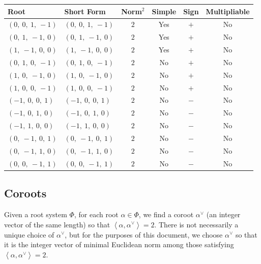 \documentclass[11pt]{article}
\newcommand{\noi}{\noindent}
\newcommand{\la}{\left\langle}
\newcommand{\ra}{\right\rangle}
\theoremstyle{definition}
\begin{document}
\noi \begin{tabular}{|l|l|c|c|c|c|}
    \hline
    \textbf{Root} & \textbf{Short Form} & \textbf{Norm$^2$} & \textbf{Simple} & \textbf{Sign} & \textbf{Multipliable} \\
    \hline
    $\left( 0, \  0, \  1, \  -1\right)$ & $\left( 0, \  0, \  1, \  -1\right)$ & $2$ & Yes & $+$ & No \\
    \hline
    $\left( 0, \  1, \  -1, \  0\right)$ & $\left( 0, \  1, \  -1, \  0\right)$ & $2$ & Yes & $+$ & No \\
    \hline
    $\left( 1, \  -1, \  0, \  0\right)$ & $\left( 1, \  -1, \  0, \  0\right)$ & $2$ & Yes & $+$ & No \\
    \hline
    $\left( 0, \  1, \  0, \  -1\right)$ & $\left( 0, \  1, \  0, \  -1\right)$ & $2$ & No & $+$ & No \\
    \hline
    $\left( 1, \  0, \  -1, \  0\right)$ & $\left( 1, \  0, \  -1, \  0\right)$ & $2$ & No & $+$ & No \\
    \hline
    $\left( 1, \  0, \  0, \  -1\right)$ & $\left( 1, \  0, \  0, \  -1\right)$ & $2$ & No & $+$ & No \\
    \hline
    $\left( -1, \  0, \  0, \  1\right)$ & $\left( -1, \  0, \  0, \  1\right)$ & $2$ & No & $-$ & No \\
    \hline
    $\left( -1, \  0, \  1, \  0\right)$ & $\left( -1, \  0, \  1, \  0\right)$ & $2$ & No & $-$ & No \\
    \hline
    $\left( -1, \  1, \  0, \  0\right)$ & $\left( -1, \  1, \  0, \  0\right)$ & $2$ & No & $-$ & No \\
    \hline
    $\left( 0, \  -1, \  0, \  1\right)$ & $\left( 0, \  -1, \  0, \  1\right)$ & $2$ & No & $-$ & No \\
    \hline
    $\left( 0, \  -1, \  1, \  0\right)$ & $\left( 0, \  -1, \  1, \  0\right)$ & $2$ & No & $-$ & No \\
    \hline
    $\left( 0, \  0, \  -1, \  1\right)$ & $\left( 0, \  0, \  -1, \  1\right)$ & $2$ & No & $-$ & No \\
    \hline
\end{tabular}


\subsection{Coroots}

Given a root system $\Phi$, for each root $\alpha \in \Phi$, we find a coroot $\alpha^\vee$ (an integer vector of the same length) so that $\la \alpha, \alpha^\vee \ra = 2$. There is not necessarily a unique choice of $\alpha^\vee$, but for the purposes of this document, we choose $\alpha^\vee$ so that it is the integer vector of minimal Euclidean norm among those satisfying $\la \alpha, \alpha^\vee \ra = 2$.
\end{document}
